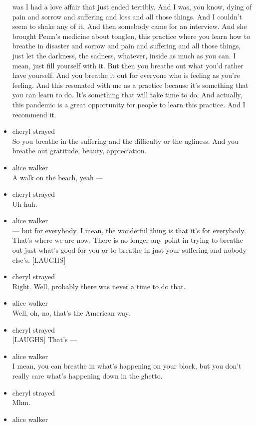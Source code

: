 \begin{itemize}
  was I had a love affair that just ended terribly. And I was, you know,
  dying of pain and sorrow and suffering and loss and all those things.
  And I couldn't seem to shake any of it. And then somebody came for an
  interview. And she brought Pema's medicine about tonglen, this
  practice where you learn how to breathe in disaster and sorrow and
  pain and suffering and all those things, just let the darkness, the
  sadness, whatever, inside as much as you can. I mean, just fill
  yourself with it. But then you breathe out what you'd rather have
  yourself. And you breathe it out for everyone who is feeling as you're
  feeling. And this resonated with me as a practice because it's
  something that you can learn to do. It's something that will take time
  to do. And actually, this pandemic is a great opportunity for people
  to learn this practice. And I recommend it.
\item
  cheryl strayed\\
  So you breathe in the suffering and the difficulty or the ugliness.
  And you breathe out gratitude, beauty, appreciation.
\item
  alice walker\\
  A walk on the beach, yeah ---
\item
  cheryl strayed\\
  Uh-huh.
\item
  alice walker\\
  --- but for everybody. I mean, the wonderful thing is that it's for
  everybody. That's where we are now. There is no longer any point in
  trying to breathe out just what's good for you or to breathe in just
  your suffering and nobody else's. {[}LAUGHS{]}
\item
  cheryl strayed\\
  Right. Well, probably there was never a time to do that.
\item
  alice walker\\
  Well, oh, no, that's the American way.
\item
  cheryl strayed\\
  {[}LAUGHS{]} That's ---
\item
  alice walker\\
  I mean, you can breathe in what's happening on your block, but you
  don't really care what's happening down in the ghetto.
\item
  cheryl strayed\\
  Mhm.
\item
  alice walker\\

\end{itemize}

